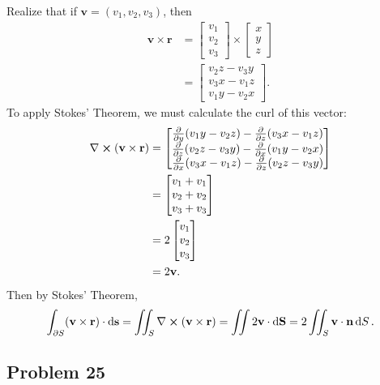 \documentclass[11pt]{article}
\renewcommand{\vec}[1]{\mathbf{#1}}
\renewcommand{\curl}{\nabla \cross}
\begin{document}
Realize that if $\vec{v} = (v_{1}, v_{2}, v_{3})$, then
\begin{align*}
	\vec{v} \times \vec{r} &= \begin{bmatrix} v_{1} \\ v_{2} \\ v_{3} \end{bmatrix} \times \begin{bmatrix} x \\ y \\ z \end{bmatrix} \\
						   &= \begin{bmatrix} v_{2} z - v_{3} y \\ v_{3} x - v_{1} z \\ v_{1} y - v_{2} x \end{bmatrix}.
\end{align*}
To apply Stokes' Theorem, we must calculate the curl of this vector:
\begin{align*}
	\curl (\vec{v} \times \vec{r}) &= \begin{bmatrix} \pdv{y} (v_{1}y - v_{2}z) - \pdv{z} (v_{3}x - v_{1}z) \\ \pdv{z} (v_{2}z - v_{3}y) - \pdv{x} (v_{1}y - v_{2}x) \\ \pdv{x} (v_{3}x - v_{1}z) - \pdv{z} (v_{2}z - v_{3}y) \end{bmatrix} \\
	&= \begin{bmatrix} v_{1} + v_{1} \\ v_{2} + v_{2} \\ v_{3} + v_{3} \end{bmatrix} \\
	&= 2 \begin{bmatrix} v_{1} \\ v_{2} \\ v_{3} \end{bmatrix} \\
	&= 2 \vec{v}.
\end{align*}
Then by Stokes' Theorem,
\[
	\int_{\partial S} (\vec{v} \times \vec{r}) \cdot \dd{\vec{s}} = \iint_{S} \curl (\vec{v} \times \vec{r}) = \iint 2 \vec{v} \cdot \dd{\vec{S}} = 2 \iint_{S} \vec{v} \cdot \vec{n} \dd{S}.
\]


\subsection*{Problem 25}
\end{document}
